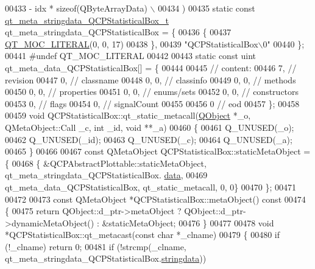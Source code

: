 \begin{DoxyCode}
00433 \textcolor{preprocessor}{        - idx * sizeof(QByteArrayData) \(\backslash\)}
00434 \textcolor{preprocessor}{    )}
00435 \textcolor{keyword}{static} \textcolor{keyword}{const} \hyperlink{a00067_da/de7/a00210}{qt\_meta\_stringdata\_QCPStatisticalBox\_t} 
      qt\_meta\_stringdata\_QCPStatisticalBox = \{
00436     \{
00437 \hyperlink{a00067_a75bb9482d242cde0a06c9dbdc6b83abe}{QT\_MOC\_LITERAL}(0, 0, 17)
00438     \},
00439     \textcolor{stringliteral}{"QCPStatisticalBox\(\backslash\)0"}
00440 \};
00441 \textcolor{preprocessor}{#undef QT\_MOC\_LITERAL}
00442 
00443 \textcolor{keyword}{static} \textcolor{keyword}{const} uint qt\_meta\_data\_QCPStatisticalBox[] = \{
00444 
00445  \textcolor{comment}{// content:}
00446        7,       \textcolor{comment}{// revision}
00447        0,       \textcolor{comment}{// classname}
00448        0,    0, \textcolor{comment}{// classinfo}
00449        0,    0, \textcolor{comment}{// methods}
00450        0,    0, \textcolor{comment}{// properties}
00451        0,    0, \textcolor{comment}{// enums/sets}
00452        0,    0, \textcolor{comment}{// constructors}
00453        0,       \textcolor{comment}{// flags}
00454        0,       \textcolor{comment}{// signalCount}
00455 
00456        0        \textcolor{comment}{// eod}
00457 \};
00458 
00459 \textcolor{keywordtype}{void} QCPStatisticalBox::qt\_static\_metacall(\hyperlink{a00059}{QObject} *\_o, QMetaObject::Call \_c, \textcolor{keywordtype}{int} \_id, \textcolor{keywordtype}{void} **\_a)
00460 \{
00461     Q\_UNUSED(\_o);
00462     Q\_UNUSED(\_id);
00463     Q\_UNUSED(\_c);
00464     Q\_UNUSED(\_a);
00465 \}
00466 
00467 \textcolor{keyword}{const} QMetaObject QCPStatisticalBox::staticMetaObject = \{
00468     \{ &QCPAbstractPlottable::staticMetaObject, qt\_meta\_stringdata\_QCPStatisticalBox.
      \hyperlink{a00067_a5e26535af2751ed72a5c0a296eff07f6}{data},
00469       qt\_meta\_data\_QCPStatisticalBox,  qt\_static\_metacall, 0, 0\}
00470 \};
00471 
00472 
00473 \textcolor{keyword}{const} QMetaObject *QCPStatisticalBox::metaObject()\textcolor{keyword}{ const}
00474 \textcolor{keyword}{}\{
00475     \textcolor{keywordflow}{return} QObject::d\_ptr->metaObject ? QObject::d\_ptr->dynamicMetaObject() : &staticMetaObject;
00476 \}
00477 
00478 \textcolor{keywordtype}{void} *QCPStatisticalBox::qt\_metacast(\textcolor{keyword}{const} \textcolor{keywordtype}{char} *\_clname)
00479 \{
00480     \textcolor{keywordflow}{if} (!\_clname) \textcolor{keywordflow}{return} 0;
00481     \textcolor{keywordflow}{if} (!strcmp(\_clname, qt\_meta\_stringdata\_QCPStatisticalBox.\hyperlink{a00067_a69ea5a8754685d08ddf21f3f6478bb52}{stringdata}))

\end{DoxyCode}
